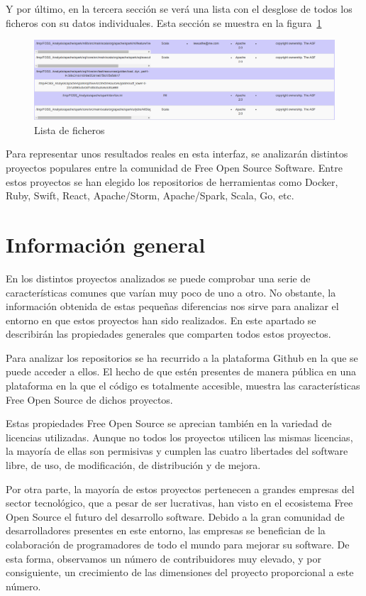 \documentclass[a4paper, spanish, 12pt]{book}
\begin{document}
Y por \'ultimo, en la tercera secci\'on se ver\'a una lista con el desglose de todos
los ficheros con su datos individuales. Esta secci\'on se muestra en la figura~\ref{fig:third_row}

\begin{figure}
  \centering
  \includegraphics[width=12cm, keepaspectratio]{img/row_third}
  \caption{Lista de ficheros}
  \label{fig:third_row}
\end{figure}

Para representar unos resultados reales en esta interfaz, se analizar\'an distintos proyectos populares entre
la comunidad de Free Open Source Software. Entre estos proyectos se han elegido los
repositorios de herramientas como Docker, Ruby, Swift, React, Apache/Storm, Apache/Spark,
Scala, Go, etc.

\section{Informaci\'on general}
\label{sec:general_info}

En los distintos proyectos analizados se puede comprobar una serie de caracter\'isticas
comunes que var\'ian muy poco de uno a otro. No obstante, la informaci\'on obtenida de
estas peque\~nas diferencias nos sirve para analizar el entorno en que estos proyectos
han sido realizados. En este apartado se describir\'an las propiedades generales que
comparten todos estos proyectos.

Para analizar los repositorios se ha recurrido a la plataforma Github en la que se puede
acceder a ellos. El hecho de que est\'en presentes de manera p\'ublica
en una plataforma en la que el c\'odigo es totalmente accesible, muestra las caracter\'isticas
Free Open Source de dichos proyectos.

Estas propiedades Free Open Source se aprecian tambi\'en en la variedad de licencias utilizadas.
Aunque no todos los proyectos utilicen las mismas licencias, la mayor\'ia de ellas son permisivas
y cumplen las cuatro libertades del software libre, de uso, de modificaci\'on, de distribuci\'on
y de mejora.

Por otra parte, la mayor\'ia de estos proyectos pertenecen a grandes empresas del sector tecnol\'ogico, que
a pesar de ser lucrativas, han visto en el ecosistema Free Open Source el futuro del desarrollo software.
Debido a la gran comunidad de desarrolladores presentes en este entorno, las empresas se benefician
de la colaboraci\'on de programadores de todo el mundo para mejorar su software. De esta forma,
observamos un n\'umero de contribuidores muy elevado, y por consiguiente, un crecimiento de
las dimensiones del proyecto proporcional a este n\'umero.
\end{document}

